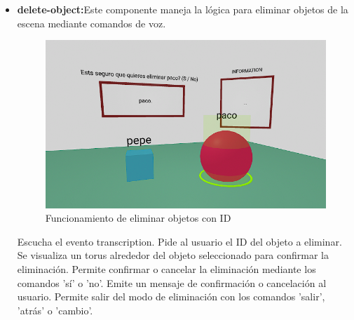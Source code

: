\documentclass[a4paper, 12pt]{book}
\begin{document}
\begin{itemize}
  \item \textbf{delete-object:}Este componente maneja la lógica para eliminar objetos de la escena mediante comandos de voz.
  \begin{figure}[H]  %
    \centering
    \includegraphics[width=0.8\linewidth]{img/generador_funcional_completo_eliminar.png}  %
    \caption{Funcionamiento de eliminar objetos con ID}  %
    \label{fig:eliminarObj}  %
  \end{figure} 
  Escucha el evento transcription.
  Pide al usuario el ID del objeto a eliminar. 
  Se visualiza un torus alrededor del objeto seleccionado para confirmar la eliminación.
  Permite confirmar o cancelar la eliminación mediante los comandos 'sí' o 'no'.
  Emite un mensaje de confirmación o cancelación al usuario.
  Permite salir del modo de eliminación con los comandos 'salir', 'atrás' o 'cambio'.


\end{itemize}
\end{document}
